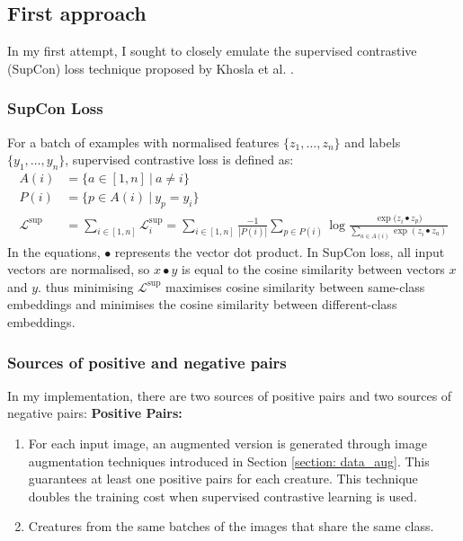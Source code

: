 \documentclass[12pt,a4paper,twoside,openany]{report}
\newcommand{\suploss}{\mathcal{L}^\text{sup}}
\begin{document}
\subsection{First approach}
In my first attempt, I sought to closely emulate the supervised contrastive (SupCon) loss technique proposed by Khosla et al. \cite{khosla_supervised_2021}.

\subsubsection{SupCon Loss}
For a batch of examples with normalised features $\{\mathit{z}_1, \dots, \mathit{z}_n\}$ and labels $\{y_1, \dots, y_n\}$, supervised contrastive loss is defined as:
\begin{align}
    A(i) &= \{a \in [1,n]\ |\ a \neq i\}\\
    P(i) &= \{p \in A(i)\ |\ y_p = y_i\}\\
    \suploss &= \sum\limits_{i\in [1, n]}\suploss_i=\sum\limits_{i\in [1, n]}\frac{-1}{|P(i)|}
    \sum\limits_{p\in P(i)}\log\frac{\exp{(\mathit{z}_i \bullet \mathit{z}_p})}{\sum\limits_{a \in A(i)}\exp{(\mathit{z}_i \bullet \mathit{z}_a)}} \label{eq:supcon}   
\end{align}
In the equations, $\bullet$ represents the vector dot product. In SupCon loss, all input vectors are normalised, so $x \bullet y$ is equal to the cosine similarity between vectors $x$ and $y$. thus minimising $\suploss$ maximises cosine similarity between same-class embeddings and minimises the cosine similarity between different-class embeddings.

\subsubsection{Sources of positive and negative pairs} \label{section:scl_double}
In my implementation, there are two sources of positive pairs and two sources of negative pairs:
\textbf{Positive Pairs:}
\begin{enumerate}
    \item For each input image, an augmented version is generated through image augmentation techniques introduced in Section \ref{section: data_aug}. This guarantees at least one positive pairs for each creature. This technique doubles the training cost when supervised contrastive learning is used.
    \item Creatures from the same batches of the images that share the same class.
\end{enumerate}
\end{document}
